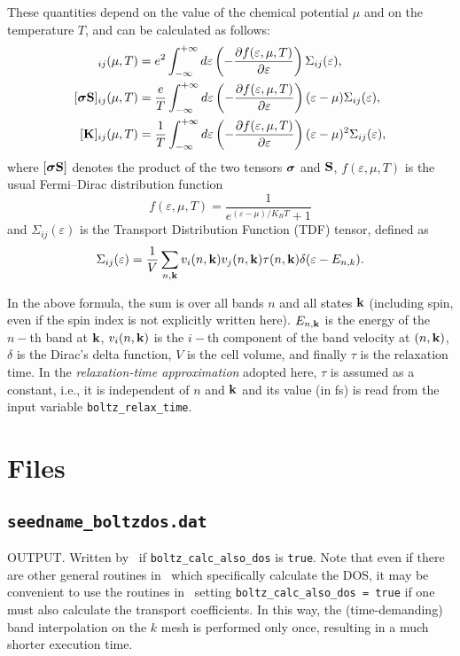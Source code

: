 These quantities depend on the value of the chemical potential $\mu$ and on the temperature $T$, and can be calculated as follows:
\begin{align}
  [\bvec \sigma]_{ij}(\mu,T)&=e^2 \int_{-\infty}^{+\infty} d\varepsilon \left(-\frac {\partial f(\varepsilon,\mu,T)}{\partial \varepsilon}\right)\Sigma_{ij}(\varepsilon), \\
  [\bvec \sigma \bvec S]_{ij}(\mu,T)&=\frac e T \int_{-\infty}^{+\infty} d\varepsilon \left(-\frac {\partial f(\varepsilon,\mu,T)}{\partial \varepsilon}\right)(\varepsilon-\mu)\Sigma_{ij}(\varepsilon), \\
  [\bvec K]_{ij}(\mu,T)&=\frac 1 T \int_{-\infty}^{+\infty} d\varepsilon \left(-\frac {\partial f(\varepsilon,\mu,T)}{\partial \varepsilon}\right)(\varepsilon-\mu)^2 \Sigma_{ij}(\varepsilon),\label{eq:boltz-thermcond}
\end{align}
where $[\bm{\mathrm{\sigma}} \bm{\mathrm{S}}]$ denotes the product of the two tensors $\bm{\mathrm{\sigma}}$ and $\bm{\mathrm{S}}$, $f(\varepsilon,\mu,T)$ is the usual Fermi--Dirac distribution function 
\begin{equation*}
  f(\varepsilon,\mu,T) = \frac{1}{e^{(\varepsilon-\mu)/K_B T}+1}
\end{equation*}
and $\Sigma_{ij}(\varepsilon)$ is the Transport Distribution Function (TDF) tensor, defined as
\begin{equation*}
  \Sigma_{ij}(\varepsilon) = \frac 1 V \sum_{n,\bm{\mathrm{k}}} v_i(n,\bm{\mathrm{k}}) v_j(n,\bm{\mathrm{k}}) \tau(n,\bm{\mathrm{k}}) \delta(\varepsilon - E_{n,k}).
\end{equation*}

In the above formula, the sum is over all bands $n$ and all states $\bm{\mathrm{k}}$ (including spin, even if the spin index is not explicitly written here). $E_{n,\bm{\mathrm{k}}}$ is the energy of the $n-$th band at $\bm{\mathrm{k}}$, $v_i(n,\bm{\mathrm{k}})$ is the $i-$th component of the band velocity at $(n,\bm{\mathrm{k}})$, $\delta$ is the Dirac's delta function, $V$ is the cell volume, and finally $\tau$ is the relaxation time. In the \emph{relaxation-time approximation} adopted here, $\tau$ is assumed as a constant, i.e., it is independent of $n$ and $\bm{\mathrm{k}}$ and its value (in fs) is read from the input variable \verb#boltz_relax_time#.

\section{Files}
\subsection{{\tt seedname\_boltzdos.dat}}
OUTPUT. Written by \postw\ if {\tt boltz\_calc\_also\_dos} is \verb#true#. Note that even if there are other general routines in \postw\ which specifically calculate the DOS, it may be convenient to use the routines in \bw\ setting {\tt boltz\_calc\_also\_dos = true} if one must also calculate the transport coefficients. In this way, the (time-demanding) band interpolation on the $k$ mesh is performed only once, resulting in a much shorter execution time.

